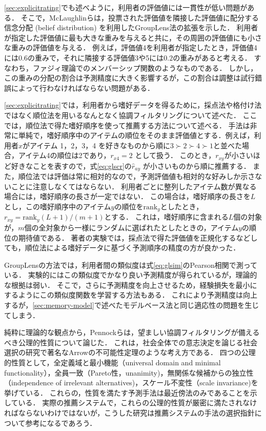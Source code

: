 \ref{sec:explicitrating}でも述べように，利用者の評価値には一貫性が低い問題がある．
そこで，McLaughlinら\cite{sigir:04:01}は，投票された評価値を隣接した評価値に配分する信念分配 (belief distribution) を利用したGroupLens法の拡張を示した．
利用者が指定した評価値に最も大きな重みを与えると共に，その周囲の評価値にも小さな重みの評価値を与える．
例えば，評価値4を利用者が指定したとき，評価値4には$0.6$の重みで，それに隣接する評価値3や5には$0.2$の重みがあると考える．
すなわち，ファジィ理論でのメンバーシップ関数のようなものである．
しかし，この重みの分配の割合は予測精度に大きく影響するが，この割合は調整は試行錯誤によって行わなければならない問題がある．

\ref{sec:explicitrating}では，利用者から嗜好データを得るために，採点法や格付け法ではなく順位法を用いるなんとなく協調フィルタリング\cite{epublist:039}について述べた．
ここでは，順位法で得た嗜好順序を使って推薦する方法について述べる．
手法は非常に単純で，嗜好順序中のアイテムの順位をそのまま評価値とする．例えば，利用者$x$がアイテム 1，2，3，4 を好きなものから順に$3{\succ}2{\succ}4{\succ}1$と並べた場合，アイテム4の順位は2であり，$r_{x4}=2$ として扱う．
このとき，$r_{xy}$が小さいほど好きなことを表すので，式\eqref{eq:glscr}の$\hat{r}_{ay}$ が小さいものから順に推薦する．
また，順位法では評価は常に相対的なので，予測評価値も相対的な好みしか示さないことに注意しなくてはならない．
利用者ごとに整列したアイテム数が異なる場合には，嗜好順序の長さが一定ではない．
この場合は，嗜好順序の長さを$L$とし，この嗜好順序中のアイテム$y$の順位を$\mathrm{rank}_y$としたとき，$r_{xy}=\mathrm{rank}_y(L+1)/(m+1)$とする．
これは，嗜好順序に含まれる$L$個の対象が，$m$個の全対象から一様にランダムに選ばれたとしたときの，アイテム$y$の順位の期待値である．
著者の実験\cite{epublist:064}では，採点法で得た評価値を正規化するなどしても，順位法による嗜好データに基づく予測順序の精度の方が良かった．

GroupLensの方法では，利用者間の類似度は式\eqref{eq:glsim}のPearson相関で測っている．
実験的にはこの類似度でかなり良い予測精度が得られているが，理論的な根拠は弱い．
そこで，さらに予測精度を向上させるため，経験損失を最小にするようにこの類似度関数を学習する方法\cite{kdd:07:01}もある．
これにより予測精度は向上するが，\ref{sec:memory-model}で述べたモデルベース法と同じ適応性の問題を生じてしまう．

純粋に理論的な観点から，Pennockら\cite{aaai:00:02}は，望ましい協調フィルタリングが備えるべき公理的性質について論じた．
これは，社会全体での意志決定を論じる社会選択の研究で著名なArrowの不可能性定理\cite{eb:040:00}のような考え方である．
四つの公理的性質として，全定義域と最小機能（universal domain and minimal functionality），全員一致（Pareto性，unanimity)，無関係な候補からの独立性（independence of irrelevant alternatives)，スケール不変性（scale invariance)を挙げている．
これらの，性質を満たす予測手法は最近傍法のみであることを示している．
実際の推薦システムで，これらの公理的性質が厳密に満たされなければならないわけではないが，こうした研究は推薦システムの手法の選択指針について参考になるであろう．
